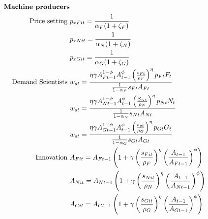 \begin{align}
%
\text{\textbf{Machine producers}}\nonumber\\
\text{Price setting}\ \vspace{4mm}&p_{xFit}=\frac{1}{\alpha_F(1+\zeta_F)}\nonumber\\
&p_{xNit}=\frac{1}{\alpha_N(1+\zeta_N)}\nonumber\\
&p_{xGit}=\frac{1}{\alpha_G(1+\zeta_G)}
\nonumber\\ 
\text{Demand Scientists}\ \vspace{4mm}&
w_{st}=\frac{\eta \gamma A_{Ft-1}^{1-\phi}A_{t-1}^{\phi}\left(\frac{s_{Ft}}{\rho_F}\right)^{\eta}p_{Ft}F_t}{\frac{1}{1-\alpha_F}s_{Ft}A_{Ft}}\nonumber\\
&
w_{st}=\frac{\eta \gamma  A_{Nt-1}^{1-\phi}A_{t-1}^{\phi}\left(\frac{S_{Nt}}{\rho_N}\right)^{\eta}p_{Nt}N_t}{\frac{1}{1-\alpha_N}s_{Nt}A_{Nt}}\nonumber\\
&
w_{st}=\frac{\eta \gamma  A_{Gt-1}^{1-\phi}A_{t-1}^{\phi}\left(\frac{s_{gt}}{\rho_G}\right)^{\eta}p_{Gt}G_t}{\frac{1}{1-\alpha_G}s_{Gt}A_{Gt}}\nonumber\\
\text{Innovation}\ \vspace{4mm}&
A_{Fit}=A_{Ft-1}\left(1+\gamma\left(\frac{s_{Fit}}{\rho_F}\right)^{\eta}\left(\frac{A_{t-1}}{A_{Ft-1}}\right)^{\phi}\right)\nonumber \\
&
A_{Nit}=A_{Nt-1}\left(1+\gamma\left(\frac{s_{Nit}}{\rho_N}\right)^{\eta}\left(\frac{A_{t-1}}{A_{Nt-1}}\right)^{\phi}\right)\nonumber \\
&
A_{Git}=A_{Gt-1}\left(1+\gamma\left(\frac{s_{Git}}{\rho_G}\right)^{\eta}\left(\frac{A_{t-1}}{A_{Gt-1}}\right)^{\phi}\right)\nonumber \\

\end{align}
